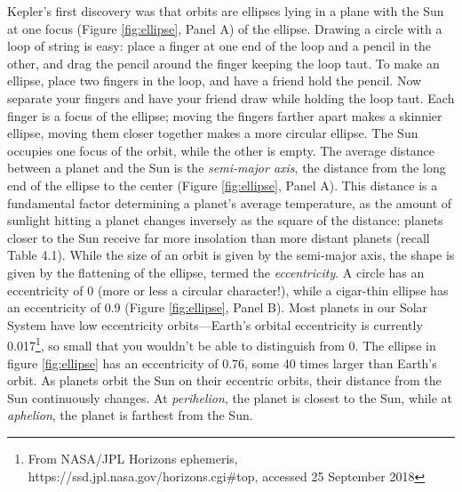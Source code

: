 \documentclass[amstex,12pt]{book}
\begin{document}
Kepler's first discovery was that orbits are ellipses lying in a plane with the Sun at one focus (Figure \ref{fig:ellipse}, Panel A) of the ellipse. Drawing a circle with a loop of string is easy: place a finger at one end of the loop and a pencil in the other, and drag the pencil around the finger keeping the loop taut. To make an ellipse, place two fingers in the loop, and have a friend hold the pencil. Now separate your fingers and have your friend draw while holding the loop taut. Each finger is a focus of the ellipse; moving the fingers farther apart makes a skinnier ellipse, moving them closer together makes a more circular ellipse. The Sun occupies one focus of the orbit, while the other is empty. The average distance between a planet and the Sun is the \emph{semi-major axis}, the distance from the long end of the ellipse to the center (Figure \ref{fig:ellipse}, Panel A). This distance is a fundamental factor determining a planet's average temperature, as the amount of sunlight hitting a planet changes inversely as the square of the distance: planets closer to the Sun receive far more insolation than more distant planets (recall Table 4.1). While the size of an orbit is given by the semi-major axis, the shape is given by the flattening of the ellipse, termed the \emph{eccentricity}. A circle has an eccentricity of 0 (more or less a circular character!), while a cigar-thin ellipse has an eccentricity of 0.9 (Figure \ref{fig:ellipse}, Panel B). Most planets in our Solar System have low eccentricity orbits---Earth's orbital eccentricity is currently 0.017\footnote{From NASA/JPL Horizons ephemeris, https://ssd.jpl.nasa.gov/horizons.cgi\#top, accessed 25 September 2018}, so small that you wouldn't be able to distinguish from 0. The ellipse in figure \ref{fig:ellipse} has an eccentricity of 0.76, some 40 times larger than Earth's orbit. As planets orbit the Sun on their eccentric orbits, their distance from the Sun continuously changes. At \emph{perihelion}, the planet is closest to the Sun, while at \emph{aphelion}, the planet is farthest from the Sun. \\
\end{document}
